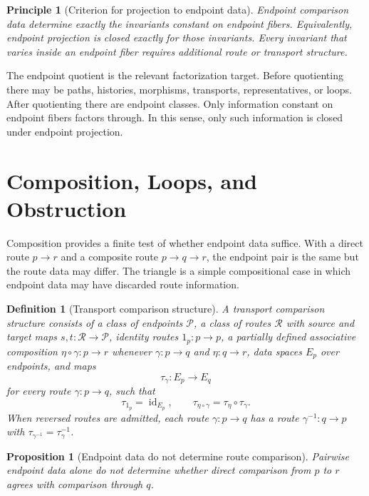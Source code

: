 \documentclass[12pt]{article}
\newtheorem{proposition}[proposition]{Proposition}
\newtheorem{definition}[definition]{Definition}
\newtheorem{principle}[principle]{Principle}
\newcommand{\calP}{\mathcal{P}}
\newcommand{\calR}{\mathcal{R}}
\newcommand{\id}{\operatorname{id}}
\begin{document}
\begin{principle}[Criterion for projection to endpoint data]
\label{prin:comparison-compression}
Endpoint comparison data determine exactly the invariants constant on
endpoint fibers. Equivalently, endpoint projection is closed exactly for
those invariants. Every invariant that varies inside an endpoint fiber
requires additional route or transport structure.
\end{principle}

The endpoint quotient is the relevant factorization target.
Before quotienting there may be paths, histories, morphisms, transports,
representatives, or loops. After quotienting there are endpoint classes.
Only information constant on endpoint fibers factors through. In this
sense, only such information is closed under endpoint projection.

\section{Composition, Loops, and Obstruction}
\label{sec:defects}

Composition provides a finite test of whether endpoint data suffice.
With a direct route $p\to r$ and a composite route $p\to q\to r$, the
endpoint pair is the same but the route data may differ. The triangle is
a simple compositional case in which endpoint data may have discarded
route information.

\begin{definition}[Transport comparison structure]
\label{def:transport-structure}
A transport comparison structure consists of a class of endpoints
$\calP$, a class of routes $\calR$ with source and target maps
$s,t:\calR\to\calP$, identity routes $1_p:p\to p$, a partially defined
associative composition $\eta\circ\gamma:p\to r$ whenever
$\gamma:p\to q$ and $\eta:q\to r$, data spaces $E_p$ over endpoints, and
maps
\[
  \tau_\gamma:E_p\to E_q
\]
for every route $\gamma:p\to q$, such that
\[
  \tau_{1_p}=\id_{E_p},\qquad
  \tau_{\eta\circ\gamma}=\tau_\eta\circ\tau_\gamma.
\]
When reversed routes are admitted, each route $\gamma:p\to q$ has a
route $\gamma^{-1}:q\to p$ with
$\tau_{\gamma^{-1}}=\tau_\gamma^{-1}$.
\end{definition}

\begin{proposition}[Endpoint data do not determine route comparison]
\label{prop:endpoint-not-route}
Pairwise endpoint data alone do not determine whether direct comparison
from $p$ to $r$ agrees with comparison through $q$.
\end{proposition}
\end{document}
